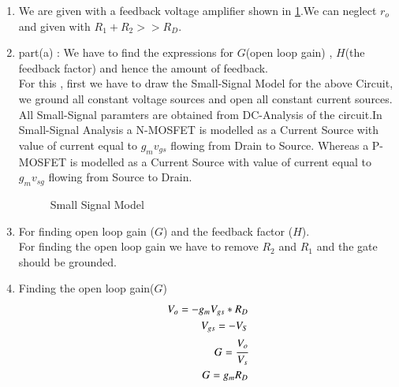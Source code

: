 \begin{enumerate}[label=\thesubsection.\arabic*.,ref=\thesubsection.\theenumi]

\item We are given with a feedback voltage amplifier shown in \ref{fig:Voltage feedback amplifier}.We can neglect $r_{o}$ and given with $R_{1}+R_{2}>>R_{D}$.\\
\begin{figure}[h!]
	\begin{center}
		\resizebox{\columnwidth/1}{!}{}
	\end{center}
	\caption{}
	\label{fig:Voltage feedback amplifier}
\end{figure}

\item part(a) : We have to find the expressions for $G$(open loop gain) , $H$(the feedback factor) and hence the amount of feedback.\\

\solution
For this , first we have to draw the Small-Signal Model for the above Circuit, we ground all constant voltage sources and open all constant current sources. All Small-Signal paramters are obtained from DC-Analysis of the circuit.In Small-Signal Analysis a N-MOSFET is modelled as a Current Source with value of current equal to $g_{m}v_{gs}$ flowing from Drain to Source. Whereas a P-MOSFET is modelled as a Current Source with value of current equal to $g_{m}v_{sg}$ flowing from Source to Drain.

\begin{figure}[h!]
	\begin{center}
		\resizebox{\columnwidth/1}{!}{}
	\end{center}
	\caption{Small Signal Model}
	\label{fig:Small_Signal}
\end{figure}


\item For finding open loop gain ($G$) and the feedback factor ($H$).\\
\solution 
For finding the open loop gain we have to remove $R_{2}$ and $R_{1}$  and the gate should be grounded.

\item Finding the open loop gain($G$)\\
\solution
\begin{align}
V_{o} = -g_{m}V_{gs}*R_{D}\\
V_{gs} = -V_{S}\\
G = \cfrac{V_{o}}{V_{s}}\\
G = g_{m}R_{D}
\end{align}


\end{enumerate}

